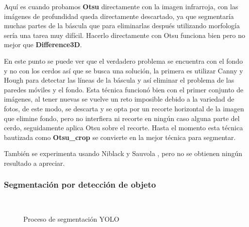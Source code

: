 ﻿\documentclass[10pt,a4paper,twocolumn,twoside]{article}
\begin{document}
    Aquí es cuando probamos \textbf{Otsu} directamente con la imagen infrarroja, con las imágenes de profundidad queda directamente descartado, ya que segmentaría muchas partes de la báscula que para eliminarlas después utilizando morfología sería una tarea muy difícil. Hacerlo directamente con Otsu funciona bien pero no mejor que \textbf{Difference3D}.
    
    En este punto se puede ver que el verdadero problema se encuentra con el fondo y no con los cerdos así que se busca una solución, la primera es utilizar Canny y Hough\cite{hough} para detectar las líneas de la báscula y así eliminar el problema de las paredes móviles y el fondo. Esta técnica funcionó bien con el primer conjunto de imágenes, al tener nuevas se vuelve un reto imposible debido a la variedad de fotos, de este modo, se descarta y se opta por un recorte horizontal de la imagen que elimine fondo, pero no interfiera ni recorte en ningún caso alguna parte del cerdo, seguidamente aplica Otsu sobre el recorte. Hasta el momento esta técnica bautizada como \textbf{Otsu\_crop} se convierte en la mejor técnica para segmentar.
    
    También se experimenta usando Niblack y Sauvola \cite{Niblack}, pero no se obtienen ningún resultado a apreciar.
    
    \subsubsection{Segmentación por detección de objeto}
    
    \begin{figure}%
    \centering
    \\
    \caption{Proceso de segmentación YOLO}%
    \label{yoloimg}%
    \end{figure}
\end{document}
